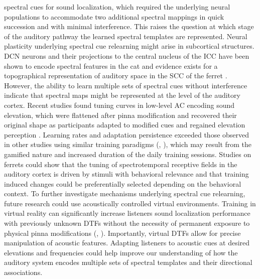 spectral cues for sound localization, which required the underlying neural populations to accommodate two additional spectral mappings in quick succession and with minimal interference. This raises the question at which stage of the auditory pathway the learned spectral templates are represented. Neural plasticity underlying spectral cue relearning might arise in subcortical structures. DCN neurons and their projections to the central nucleus of the ICC have been shown to encode spectral features in the cat \citep{davis_auditory_2003} and evidence exists for a topographical representation of auditory space in the SCC of the ferret \citep{king_spatial_1987}. However, the ability to learn multiple sets of spectral cues without interference indicate that spectral maps might be represented at the level of the auditory cortex. Recent studies found tuning curves in low-level AC encoding sound elevation, which were flattened after pinna modification and recovered their original shape as participants adapted to modified cues and regained elevation perception \citep{trapeau_encoding_2018}. Learning rates and adaptation persistence exceeded those observed in other studies using similar training paradigms (\citet{parseihian_rapid_2012}, \citet{trapeau_fast_2016}), which may result from the gamified nature and increased duration of the daily training sessions. Studies on ferrets could show that the tuning of spectrotemporal receptive fields in the auditory cortex is driven by stimuli with behavioral relevance and that training induced changes could be preferentially selected depending on the behavioral context. To further investigate mechanisms underlying spectral cue relearning, future research could use acoustically controlled virtual environments. Training in virtual reality can significantly increase listeners sound localization performance with previously unknown DTFs without the necessity of permanent exposure to physical pinna modifications (\citet{honda_transfer_2007}, \citet{steadman_short-term_2019}). Importantly, virtual DTFs allow for precise manipulation of acoustic features. Adapting listeners to acoustic cues at desired elevations and frequencies could help improve our understanding of how the auditory system encodes multiple sets of spectral templates and their directional associations. 